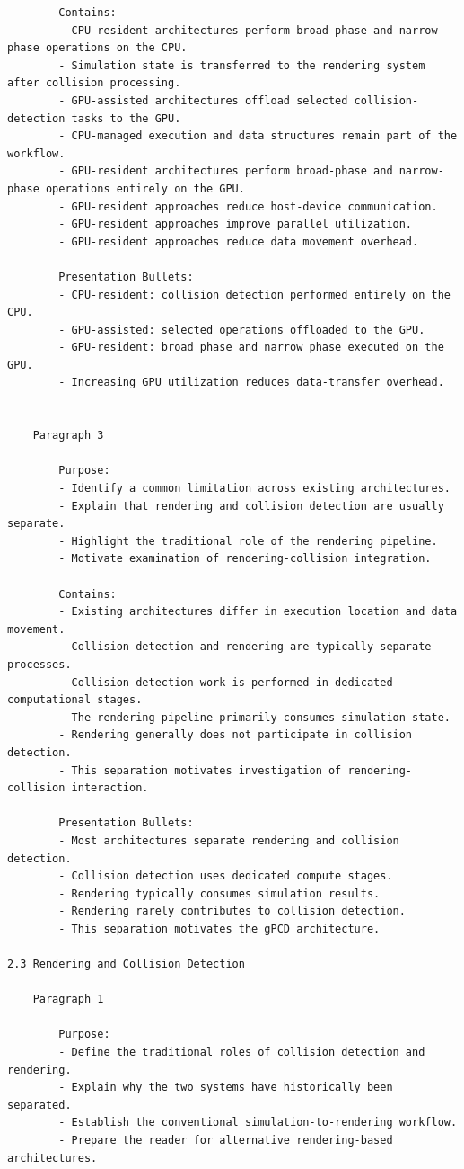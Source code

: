 \begin{verbatim}
		Contains:
		- CPU-resident architectures perform broad-phase and narrow-phase operations on the CPU.
		- Simulation state is transferred to the rendering system after collision processing.
		- GPU-assisted architectures offload selected collision-detection tasks to the GPU.
		- CPU-managed execution and data structures remain part of the workflow.
		- GPU-resident architectures perform broad-phase and narrow-phase operations entirely on the GPU.
		- GPU-resident approaches reduce host-device communication.
		- GPU-resident approaches improve parallel utilization.
		- GPU-resident approaches reduce data movement overhead.

		Presentation Bullets:
		- CPU-resident: collision detection performed entirely on the CPU.
		- GPU-assisted: selected operations offloaded to the GPU.
		- GPU-resident: broad phase and narrow phase executed on the GPU.
		- Increasing GPU utilization reduces data-transfer overhead.


	Paragraph 3

		Purpose:
		- Identify a common limitation across existing architectures.
		- Explain that rendering and collision detection are usually separate.
		- Highlight the traditional role of the rendering pipeline.
		- Motivate examination of rendering-collision integration.

		Contains:
		- Existing architectures differ in execution location and data movement.
		- Collision detection and rendering are typically separate processes.
		- Collision-detection work is performed in dedicated computational stages.
		- The rendering pipeline primarily consumes simulation state.
		- Rendering generally does not participate in collision detection.
		- This separation motivates investigation of rendering-collision interaction.

		Presentation Bullets:
		- Most architectures separate rendering and collision detection.
		- Collision detection uses dedicated compute stages.
		- Rendering typically consumes simulation results.
		- Rendering rarely contributes to collision detection.
		- This separation motivates the gPCD architecture.   
   
2.3 Rendering and Collision Detection

	Paragraph 1

		Purpose:
		- Define the traditional roles of collision detection and rendering.
		- Explain why the two systems have historically been separated.
		- Establish the conventional simulation-to-rendering workflow.
		- Prepare the reader for alternative rendering-based architectures.


\end{verbatim}
